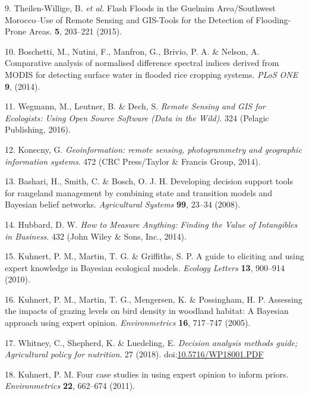 \documentclass[12pt,oneside]{article}
\begin{document}
\leavevmode\hypertarget{ref-Theilen-Willige_et_al_2015}{}%
9. Theilen-Willige, B. \emph{et al.} Flash Floods in the Guelmim
Area/Southwest Morocco--Use of Remote Sensing and GIS-Tools for the
Detection of Flooding-Prone Areas. \textbf{5}, 203--221 (2015).

\leavevmode\hypertarget{ref-Boschetti_et_al_2014}{}%
10. Boschetti, M., Nutini, F., Manfron, G., Brivio, P. A. \& Nelson, A.
Comparative analysis of normalised difference spectral indices derived
from MODIS for detecting surface water in flooded rice cropping systems.
\emph{PLoS ONE} \textbf{9}, (2014).

\leavevmode\hypertarget{ref-Wegmann_et_al_2016}{}%
11. Wegmann, M., Leutner, B. \& Dech, S. \emph{Remote Sensing and GIS
for Ecologists: Using Open Source Software (Data in the Wild)}. 324
(Pelagic Publishing, 2016).

\leavevmode\hypertarget{ref-Konecny_2014}{}%
12. Konecny, G. \emph{Geoinformation: remote sensing, photogrammetry and
geographic information systems}. 472 (CRC Press/Taylor \& Francis Group,
2014).

\leavevmode\hypertarget{ref-Bashari_et_al_2008}{}%
13. Bashari, H., Smith, C. \& Bosch, O. J. H. Developing decision
support tools for rangeland management by combining state and transition
models and Bayesian belief networks. \emph{Agricultural Systems}
\textbf{99}, 23--34 (2008).

\leavevmode\hypertarget{ref-Hubbard_2014}{}%
14. Hubbard, D. W. \emph{How to Measure Anything: Finding the Value of
Intangibles in Business}. 432 (John Wiley \& Sons, Inc., 2014).

\leavevmode\hypertarget{ref-Kuhnert_et_al_2010}{}%
15. Kuhnert, P. M., Martin, T. G. \& Griffiths, S. P. A guide to
eliciting and using expert knowledge in Bayesian ecological models.
\emph{Ecology Letters} \textbf{13}, 900--914 (2010).

\leavevmode\hypertarget{ref-Kuhnert_et_al_2005}{}%
16. Kuhnert, P. M., Martin, T. G., Mengersen, K. \& Possingham, H. P.
Assessing the impacts of grazing levels on bird density in woodland
habitat: A Bayesian approach using expert opinion. \emph{Environmetrics}
\textbf{16}, 717--747 (2005).

\leavevmode\hypertarget{ref-Whitney_et_al_2018}{}%
17. Whitney, C., Shepherd, K. \& Luedeling, E. \emph{Decision analysis
methods guide; Agricultural policy for nutrition}. 27 (2018).
doi:\href{https://doi.org/10.5716/WP18001.PDF}{10.5716/WP18001.PDF}

\leavevmode\hypertarget{ref-Kuhnert_2011}{}%
18. Kuhnert, P. M. Four case studies in using expert opinion to inform
priors. \emph{Environmetrics} \textbf{22}, 662--674 (2011).
\end{document}
